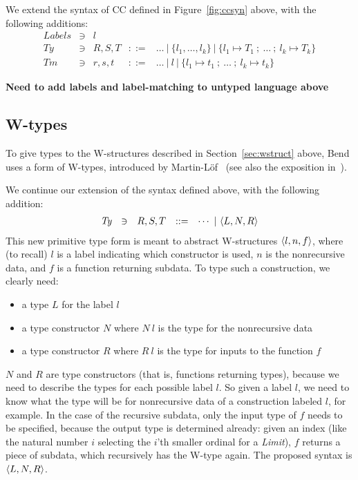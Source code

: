 \documentclass{article}
\begin{document}
We extend the syntax of CC defined in Figure~\ref{fig:ccsyn} above, with the following additions:
\[
\begin{array}{lllll}
  \textit{Labels} & \ni & l &\ &\ \\
  \textit{Ty} & \ni & R,S,T & ::= & \ldots\ |\ \{ l_1, \ldots, l_k \}\ |\ \{ l_1 \mapsto T_1\ ;\ \ldots\ ;\ l_k \mapsto T_k \} \\
  \textit{Tm} & \ni & r,s,t & ::= & \ldots\ |\ l\ |\ \{ l_1 \mapsto t_1\ ;\ \ldots\ ;\ l_k \mapsto t_k \}
\end{array}
\]
\noindent

\textbf{Need to add labels and label-matching to untyped language above}


\subsection{W-types}

To give types to the W-structures described in Section~\ref{sec:wstruct} above,
Bend uses a form of W-types, introduced by Martin-L\"of~\cite{Mar84} (see also
the exposition in~\cite{mlttprog}).

We continue our extension of the syntax defined above, with the following addition:
\[
\begin{array}{lllll}
  \textit{Ty} & \ni & R,S,T & ::= & \cdots\ |\ \w{L}{N}{R} 
\end{array}
\]
\noindent This new primitive type form is meant to abstract
W-structures $\langle l , n, f \rangle$, where (to recall) $l$ is a label
indicating which constructor is used, $n$ is the nonrecursive data,
and $f$ is a function returning subdata.  To type such a construction,
we clearly need:
\begin{itemize}
\item a type $L$ for the label $l$
\item a type constructor $N$ where $N\ l$ is the type for the nonrecursive data
\item a type constructor $R$ where $R\ l$ is the type for inputs to the function $f$
\end{itemize}
\noindent $N$ and $R$ are type constructors (that is, functions returning types), because
we need to describe the types for each possible label $l$.  So given a label $l$, we need
to know what the type will be for nonrecursive data of a construction labeled $l$, for example.
In the case of the recursive subdata, only the input type of $f$ needs to be specified, because the output
type is determined already: given an index (like the natural number $i$ selecting the $i$'th smaller
ordinal for a \textit{Limit}), $f$ returns a piece of subdata, which recursively
has the W-type again.  The proposed syntax is $\langle L , N , R \rangle$.
\end{document}
